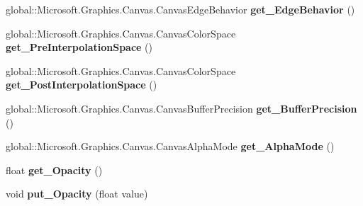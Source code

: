 \begin{DoxyCompactItemize}
global\+::\+Microsoft.\+Graphics.\+Canvas.\+Canvas\+Edge\+Behavior {\bfseries get\+\_\+\+Edge\+Behavior} ()
\item 
\mbox{\label{class_microsoft_1_1_graphics_1_1_canvas_1_1_brushes_1_1_canvas_linear_gradient_brush_ae768f664c240426af7715b7aadf47101}} 
global\+::\+Microsoft.\+Graphics.\+Canvas.\+Canvas\+Color\+Space {\bfseries get\+\_\+\+Pre\+Interpolation\+Space} ()
\item 
\mbox{\label{class_microsoft_1_1_graphics_1_1_canvas_1_1_brushes_1_1_canvas_linear_gradient_brush_a83d5f9d271cffb836af96b6da7aa38fa}} 
global\+::\+Microsoft.\+Graphics.\+Canvas.\+Canvas\+Color\+Space {\bfseries get\+\_\+\+Post\+Interpolation\+Space} ()
\item 
\mbox{\label{class_microsoft_1_1_graphics_1_1_canvas_1_1_brushes_1_1_canvas_linear_gradient_brush_a1fdb7f1a72634524c8a485a1ca69bd02}} 
global\+::\+Microsoft.\+Graphics.\+Canvas.\+Canvas\+Buffer\+Precision {\bfseries get\+\_\+\+Buffer\+Precision} ()
\item 
\mbox{\label{class_microsoft_1_1_graphics_1_1_canvas_1_1_brushes_1_1_canvas_linear_gradient_brush_ac8d376e678069dd7666b39fc75c7fc79}} 
global\+::\+Microsoft.\+Graphics.\+Canvas.\+Canvas\+Alpha\+Mode {\bfseries get\+\_\+\+Alpha\+Mode} ()
\item 
\mbox{\label{class_microsoft_1_1_graphics_1_1_canvas_1_1_brushes_1_1_canvas_linear_gradient_brush_aa2c8990316be2dafd3008ae1fab87e99}} 
float {\bfseries get\+\_\+\+Opacity} ()
\item 
\mbox{\label{class_microsoft_1_1_graphics_1_1_canvas_1_1_brushes_1_1_canvas_linear_gradient_brush_a752ac3d182c455c9b17f96fec88a0cf5}} 
void {\bfseries put\+\_\+\+Opacity} (float value)
\item 
\mbox{\label{class_microsoft_1_1_graphics_1_1_canvas_1_1_brushes_1_1_canvas_linear_gradient_brush_a15c2e7c623084a71ef4da4b76b4dfb43}} 

\end{DoxyCompactItemize}
